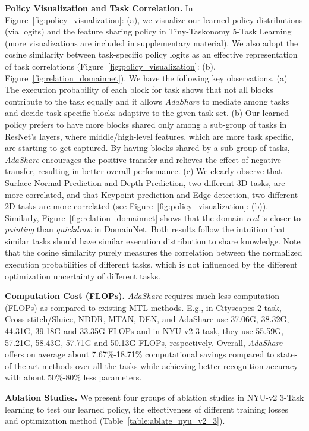 \noindent\textbf{Policy Visualization and Task Correlation.}
In Figure~\ref{fig:policy_visualization}: (a), we visualize our learned policy distributions (via logits) and the feature sharing policy in Tiny-Taskonomy 5-Task Learning (more visualizations are included in supplementary material). We also adopt the cosine similarity between task-specific policy logits as an effective representation of task correlations (Figure~\ref{fig:policy_visualization}: (b), Figure~\ref{fig:relation_domainnet}).
We have the following key observations. (a) The execution probability of each block for task  shows that not all blocks contribute to the task equally and it allows \textit{AdaShare} to mediate among tasks and decide task-specific blocks adaptive to the given task set. (b) Our learned policy prefers to have more blocks shared only among a sub-group of tasks in ResNet's  layers, where middle/high-level features, which are more task specific, are starting to get captured. By having blocks shared by a sub-group of tasks, \textit{AdaShare} encourages the positive transfer and relieves the effect of negative transfer, resulting in better overall performance. (c) We clearly observe that Surface Normal Prediction and Depth Prediction, two different 3D tasks, are more correlated, and that Keypoint prediction and Edge detection, two different 2D tasks are more correlated (see Figure~\ref{fig:policy_visualization}: (b)). Similarly, Figure~\ref{fig:relation_domainnet} shows that the domain \textit{real} is closer to \textit{painting} than \textit{quickdraw} in DomainNet. Both results follow the intuition that similar tasks should have similar execution distribution to share knowledge. 
Note that the cosine similarity purely measures the correlation between the normalized execution probabilities of different tasks, which is not influenced by the different optimization uncertainty of different tasks.


\noindent\textbf{Computation Cost (FLOPs).}
\textit{AdaShare} requires much less computation (FLOPs) as compared to existing MTL methods. E.g., in Cityscapes 2-task, Cross-stitch/Sluice, NDDR, MTAN, DEN, and AdaShare use 37.06G, 38.32G, 44.31G, 39.18G and 33.35G FLOPs and in NYU v2 3-task, they use 55.59G, 57.21G, 58.43G, 57.71G and 50.13G FLOPs, respectively. Overall, \textit{AdaShare} offers on average about 7.67\%-18.71\% computational savings compared to state-of-the-art methods over all the tasks while achieving better recognition accuracy with about 50\%-80\% less parameters.

\noindent\textbf{Ablation Studies.}
We present four groups of ablation studies in NYU-v2 3-Task learning to test our learned policy, the effectiveness of different training losses and optimization method (Table~\ref{table:ablate_nyu_v2_3}). 

